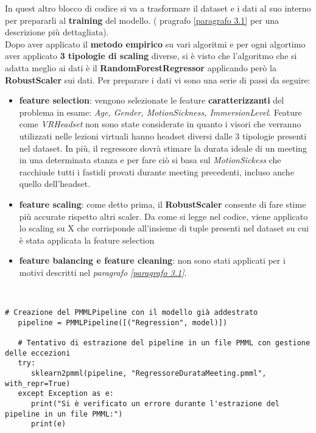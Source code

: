 In quest altro blocco di codice si va a trasformare il dataset e i dati al suo interno per prepararli al \textbf{training} del modello. ( pragrafo \ref{paragrafo 3.1} per una descrizione più dettagliata). \vspace{1ex}\\ 
Dopo aver applicato il \textbf{metodo empirico} su vari algoritmi e per ogni algortimo aver applicato \textbf{3 tipologie di scaling} diverse, si è visto che l'algoritmo che si adatta meglio ai dati è il \textbf{RandomForestRegressor} applicando però la \textbf{RobustScaler} sui dati.
Per preparare i dati vi sono una serie di passi da seguire:
\par{
\begin{itemize}
   \item \textbf{feature selection}: vengono selezionate le feature \textbf{caratterizzanti} del problema in esame: \textit{Age, Gender, MotionSickness, ImmersionLevel}. Feature come \textit{VRHeadset} non sono state considerate in quanto i visori che verranno utilizzati nelle lezioni virtuali hanno headset diversi dalle 3 tipologie presenti nel dataset. In più, il regressore dovrà stimare la durata ideale di un meeting in una determinata stanza e per fare ciò si basa sul \textit{MotionSickess} che racchiude tutti i fastidi provati durante meeting precedenti, incluso anche quello dell'headset. 
   \item \textbf{feature scaling}: come detto prima, il \textbf{RobustScaler} consente di fare stime più accurate rispetto altri scaler. Da come si legge nel codice, viene applicato lo scaling su X che corrisponde all'insieme di tuple presenti nel dataset su cui è stata applicata la feature selection
   \item \textbf{feature balancing e feature cleaning}: non 
   sono stati applicati per i motivi descritti nel \textit{paragrafo \ref{paragrafo 3.1}}.
\end{itemize}
} \\ 

\begin{lstlisting}[caption=Conversione in un file PMML]
   # Creazione del PMMLPipeline con il modello già addestrato
   pipeline = PMMLPipeline([("Regression", model)])

   # Tentativo di estrazione del pipeline in un file PMML con gestione delle eccezioni
   try:
      sklearn2pmml(pipeline, "RegressoreDurataMeeting.pmml", with_repr=True)
   except Exception as e:
      print("Si è verificato un errore durante l'estrazione del pipeline in un file PMML:")
      print(e)
\end{lstlisting} 

